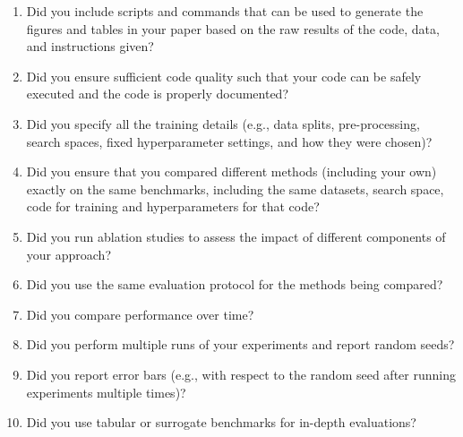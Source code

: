 \documentclass[11pt]{article}
\begin{document}
\begin{enumerate}
\begin{enumerate}
  \item Did you include scripts and commands that can be used to generate the
    figures and tables in your paper based on the raw results of the code, data,
    and instructions given?
  \item Did you ensure sufficient code quality such that your code can be safely
    executed and the code is properly documented?
  \item Did you specify all the training details (e.g., data splits,
    pre-processing, search spaces, fixed hyperparameter settings, and how they
    were chosen)?
  \item Did you ensure that you compared different methods (including your own)
    exactly on the same benchmarks, including the same datasets, search space,
    code for training and hyperparameters for that code?
  \item Did you run ablation studies to assess the impact of different
    components of your approach?
  \item Did you use the same evaluation protocol for the methods being compared?
  \item Did you compare performance over time?
  \item Did you perform multiple runs of your experiments and report random seeds?
  \item Did you report error bars (e.g., with respect to the random seed after
    running experiments multiple times)?
  \item Did you use tabular or surrogate benchmarks for in-depth evaluations?

\end{enumerate}
\end{enumerate}
\end{document}
